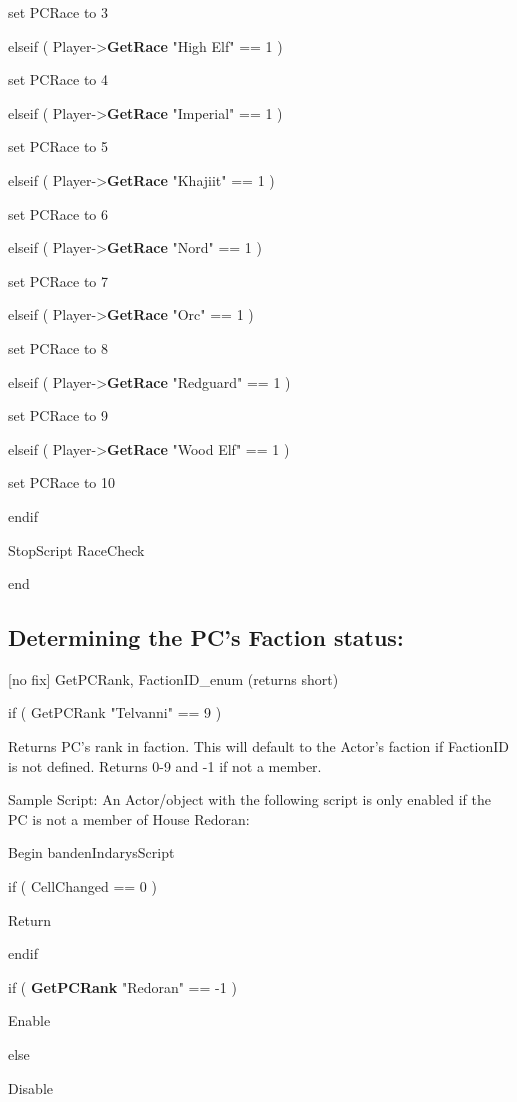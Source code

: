 \documentclass[
]{article}
\begin{document}
set PCRace to 3

elseif ( Player-\textgreater{}\textbf{GetRace} "High Elf" == 1 )

set PCRace to 4

elseif ( Player-\textgreater{}\textbf{GetRace} "Imperial" == 1 )

set PCRace to 5

elseif ( Player-\textgreater{}\textbf{GetRace} "Khajiit" == 1 )

set PCRace to 6

elseif ( Player-\textgreater{}\textbf{GetRace} "Nord" == 1 )

set PCRace to 7

elseif ( Player-\textgreater{}\textbf{GetRace} "Orc" == 1 )

set PCRace to 8

elseif ( Player-\textgreater{}\textbf{GetRace} "Redguard" == 1 )

set PCRace to 9

elseif ( Player-\textgreater{}\textbf{GetRace} "Wood Elf" == 1 )

set PCRace to 10

endif

StopScript RaceCheck

end

\hypertarget{determining-the-pcs-faction-status}{%
\subsection{Determining the PC's Faction
status:}\label{determining-the-pcs-faction-status}}

{[}no fix{]} GetPCRank, FactionID\_enum (returns short)

if ( GetPCRank "Telvanni" == 9 )

Returns PC's rank in faction. This will default to the Actor's faction
if FactionID is not defined. Returns 0-9 and -1 if not a member.

Sample Script: An Actor/object with the following script is only enabled
if the PC is not a member of House Redoran:

Begin bandenIndarysScript

if ( CellChanged == 0 )

Return

endif

if ( \textbf{GetPCRank} "Redoran" == -1 )

Enable

else

Disable
\end{document}
